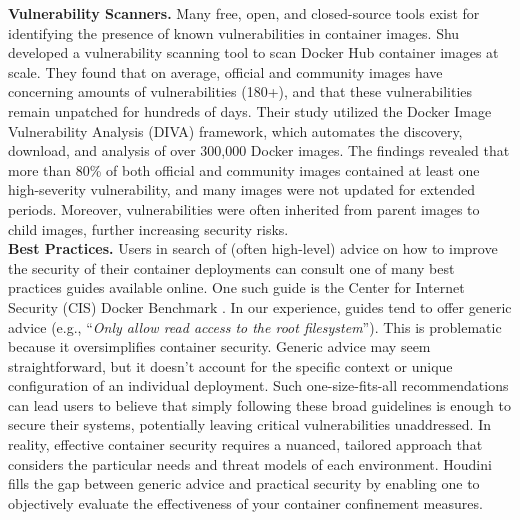 \documentclass[12pt]{report}
\begin{document}
\begin{doublespace}
\noindent\textbf{Vulnerability Scanners.} Many free, open, and closed-source tools exist for identifying the presence of known vulnerabilities in container images. Shu \etal~\cite{shu2017study} developed a vulnerability scanning tool to scan Docker Hub container images at scale. They found that on average, official and community images have concerning amounts of vulnerabilities (180+), and that these vulnerabilities remain unpatched for hundreds of days. Their study utilized the Docker Image Vulnerability Analysis (DIVA) framework, which automates the discovery, download, and analysis of over 300,000 Docker images. The findings revealed that more than 80\% of both official and community images contained at least one high-severity vulnerability, and many images were not updated for extended periods. Moreover, vulnerabilities were often inherited from parent images to child images, further increasing security risks.\\

\noindent\textbf{Best Practices.} Users in search of (often high-level) advice on how to improve the security of their container deployments can consult one of many best practices guides available online. One such guide is the Center for Internet Security (CIS) Docker Benchmark \cite{CIS}. In our experience, guides tend to offer generic advice (e.g., ``\textit{Only allow read access to the root filesystem}''). This is problematic because it oversimplifies container security. Generic advice may seem straightforward, but it doesn't account for the specific context or unique configuration of an individual deployment. Such one-size-fits-all recommendations can lead users to believe that simply following these broad guidelines is enough to secure their systems, potentially leaving critical vulnerabilities unaddressed. In reality, effective container security requires a nuanced, tailored approach that considers the particular needs and threat models of each environment. Houdini fills the gap between generic advice and practical security by enabling one to objectively evaluate the effectiveness of your container confinement measures.\\


\end{doublespace}
\end{document}
